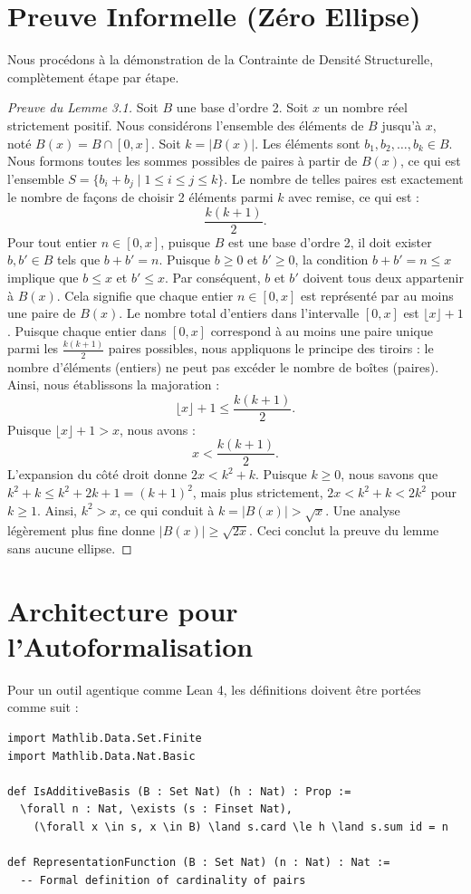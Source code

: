 \documentclass[12pt, a4paper]{article}
\theoremstyle{definition}
\begin{document}
\section{Preuve Informelle (Zéro Ellipse)}

Nous procédons à la démonstration de la Contrainte de Densité Structurelle, complètement étape par étape.
\begin{proof}[Preuve du Lemme 3.1]
Soit $B$ une base d'ordre 2. Soit $x$ un nombre réel strictement positif.
Nous considérons l'ensemble des éléments de $B$ jusqu'à $x$, noté $B(x) = B \cap [0, x]$.
Soit $k = |B(x)|$. Les éléments sont $b_1, b_2, \dots, b_k \in B$.
Nous formons toutes les sommes possibles de paires à partir de $B(x)$, ce qui est l'ensemble $S = \{b_i + b_j \mid 1 \le i \le j \le k\}$.
Le nombre de telles paires est exactement le nombre de façons de choisir 2 éléments parmi $k$ avec remise, ce qui est :
$$ \frac{k(k+1)}{2}. $$
Pour tout entier $n \in [0, x]$, puisque $B$ est une base d'ordre 2, il doit exister $b, b' \in B$ tels que $b + b' = n$.
Puisque $b \ge 0$ et $b' \ge 0$, la condition $b + b' = n \le x$ implique que $b \le x$ et $b' \le x$.
Par conséquent, $b$ et $b'$ doivent tous deux appartenir à $B(x)$.
Cela signifie que chaque entier $n \in [0, x]$ est représenté par au moins une paire de $B(x)$.
Le nombre total d'entiers dans l'intervalle $[0, x]$ est $\lfloor x \rfloor + 1$.
Puisque chaque entier dans $[0, x]$ correspond à au moins une paire unique parmi les $\frac{k(k+1)}{2}$ paires possibles, nous appliquons le principe des tiroirs : le nombre d'éléments (entiers) ne peut pas excéder le nombre de boîtes (paires). Ainsi, nous établissons la majoration :
$$ \lfloor x \rfloor + 1 \le \frac{k(k+1)}{2}. $$
Puisque $\lfloor x \rfloor + 1 > x$, nous avons :
$$ x < \frac{k(k+1)}{2}. $$
L'expansion du côté droit donne $2x < k^2 + k$.
Puisque $k \ge 0$, nous savons que $k^2 + k \le k^2 + 2k + 1 = (k+1)^2$, mais plus strictement, $2x < k^2 + k < 2k^2$ pour $k \ge 1$.
Ainsi, $k^2 > x$, ce qui conduit à $k = |B(x)| > \sqrt{x}$. Une analyse légèrement plus fine donne $|B(x)| \ge \sqrt{2x}$.
Ceci conclut la preuve du lemme sans aucune ellipse.
\end{proof}

\section{Architecture pour l'Autoformalisation}
Pour un outil agentique comme Lean 4, les définitions doivent être portées comme suit :
\begin{verbatim}
import Mathlib.Data.Set.Finite
import Mathlib.Data.Nat.Basic

def IsAdditiveBasis (B : Set Nat) (h : Nat) : Prop :=
  \forall n : Nat, \exists (s : Finset Nat),
    (\forall x \in s, x \in B) \land s.card \le h \land s.sum id = n

def RepresentationFunction (B : Set Nat) (n : Nat) : Nat :=
  -- Formal definition of cardinality of pairs
\end{verbatim}
\end{document}
